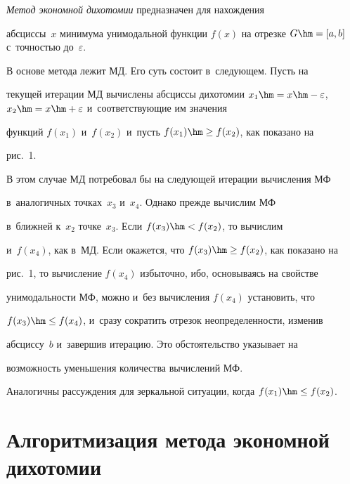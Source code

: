   \textit{Метод экономной дихотомии} предназначен для нахождения 


абсциссы~$x$ минимума унимодальной функции $f(x)$ на отрезке $G \hm= [a, 


b]$ с~точностью до~$\varepsilon$. 


  





  В основе метода лежит МД. Его суть состоит в~следующем. Пусть на 


текущей итерации МД вычислены абсциссы дихотомии $x_1 \hm= x \hm- 


\varepsilon$, $x_2 \hm= x \hm+ \varepsilon$ и~соответствующие им значения 


функций $f(x_1)$ и~$f(x_2)$ и~пусть $f(x_1) \hm\geq f(x_2)$, как показано на 


рис.~1.


  


  В этом случае МД потребовал бы на следующей итерации вычисления МФ 


в~аналогичных точках~$x_3$ и~$x_4$. Однако прежде вычислим МФ 


в~ближней к~$x_2$ точке~$x_3$. Если $f(x_3)\hm< f(x_2)$, то вычислим 


и~$f(x_4)$, как в~МД. Если окажется, что $f(x_3)\hm\geq f(x_2)$, как показано на 


рис.~1, то вычисление $f(x_4)$ избыточно, ибо, основываясь на свойстве 


унимодальности МФ, можно и~без вычисления $f(x_4)$ установить, что 


$f(x_3)\hm\leq f(x_4)$, и~сразу сократить отрезок неопределенности, изменив 


абсциссу~$b$ и~завершив итерацию. Это обстоятельство указывает на 


возможность уменьшения количества вычислений МФ.


  


  Аналогичны рассуждения для зеркальной ситуации, когда $f(x_1) \hm\leq 


f(x_2)$. 





\section{Алгоритмизация метода экономной дихотомии}





